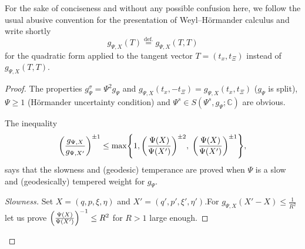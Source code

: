 \documentclass[AHL,Unicode,longabstracts]{cedram}
\newcommand{\C}{\mathbb{C}}
\let\originalleft\left
\let\originalright\right
\renewcommand{\left}{\mathopen{}\mathclose\bgroup\originalleft}
\renewcommand{\right}{\aftergroup\egroup\originalright}
\begin{document}
For the sake of conciseness and without any possible confusion here, we follow the usual abusive convention for the presentation of Weyl--H\"ormander calculus and write shortly
\[
g_{\Psi,X}(T)
\overset{\text{def.}}=g_{\Psi,X}(T,T)
\]
for the quadratic form applied to the tangent vector $T=(t_{x},t_{\Xi})$ instead of $g_{\Psi,X}(T,T)$.
\begin{proof}
The properties $g^{\sigma}_{\Psi}=\Psi^{2}g_{\Psi}$ and $g_{\Psi,X}(t_{x},-t_{\Xi})=g_{\Psi,X}(t_{x},t_{\Xi})$ ($g_{\Psi}$ is split), $\Psi\geq 1$ (H\"ormander uncertainty condition) and $\Psi^{s}\in S(\Psi^{s},g_{\Psi};\C)$ are obvious.

The inequality
\begin{equation}\label{eq:rappgXgXprime}
\left(\frac{g_{\Psi,X}}{g_{\Psi,X'}}\right)^{\pm 1}\leq \max \left\{1,\left(\frac{\Psi(X)}{\Psi(X')}\right)^{\pm 2},\; \left(\frac{\Psi(X)}{\Psi(X')}\right)^{\pm 1}\right\},
\end{equation}
says that the slowness and (geodesic) temperance are proved when $\Psi$ is a slow and (geodesically) tempered weight for $g_{\Psi}$.

\begin{proof}[{Slowness}]
Set $X=(q,p,\xi,\eta)$ and $X'=(q',p',\xi',\eta')$.For $g_{\Psi,X}(X'-X)\leq \frac{1}{R^{2}}$ let us prove $\left(\frac{\Psi(X)}{\Psi(X')}\right)^{-1}\leq R^{2}$ for $R>1$ large enough.


\end{proof}
\end{proof}
\end{document}
